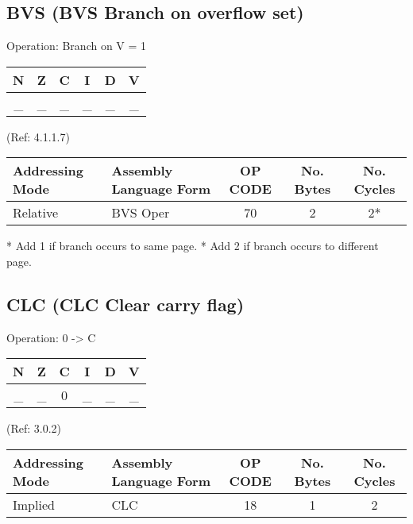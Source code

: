 \documentclass{article}
\begin{document}
  \subsection{BVS (BVS Branch on overflow set)}

  Operation:  Branch on V = 1
  \begin{table}[H]
  \centering
  \begin{tabular}{|c c c c c c|}
  \hline
  N&Z&C&I&D&V\\
  \hline
  \_ & \_ & \_ & \_ & \_ & \_\\
  \hline
  \end{tabular}
  \end{table}
                               (Ref: 4.1.1.7)
  \begin{table}[H]
  \centering
  \begin{tabular}{|l|l|c|c|c|}
  \hline
   Addressing Mode& Assembly Language Form& OP CODE &No. Bytes&No. Cycles\\
  \hline
    Relative      &   BVS Oper            &    70   &    2    &    2*\\
  \hline
  \end{tabular}
  \end{table}
  * Add 1 if branch occurs to same page.
  * Add 2 if branch occurs to different page.


  \subsection{CLC (CLC Clear carry flag)}

  Operation:  0 -> C
  \begin{table}[H]
  \centering
  \begin{tabular}{|c c c c c c|}
  \hline
  N&Z&C&I&D&V\\
  \hline
  \_ & \_ & 0 & \_ & \_ & \_\\
  \hline
  \end{tabular}
  \end{table}
                                (Ref: 3.0.2)
  \begin{table}[H]
  \centering
  \begin{tabular}{|l|l|c|c|c|}
  \hline
   Addressing Mode& Assembly Language Form& OP CODE &No. Bytes&No. Cycles\\
  \hline
    Implied       &   CLC                 &    18   &    1    &    2\\
  \hline
  \end{tabular}
  \end{table}
\end{document}
